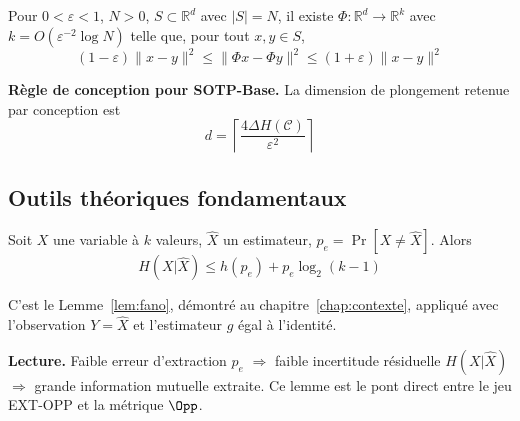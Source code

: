 \begin{sloppypar}
\begin{definition}\label{def:ann_jl}
Pour $0 < \varepsilon < 1$, $N > 0$, $S \subset \mathbb{R}^d$ avec
$|S| = N$, il existe $\Phi\colon \mathbb{R}^d \to \mathbb{R}^k$ avec
$k = O(\varepsilon^{-2} \log N)$ telle que, pour tout $x,y \in S$,
\begin{equation}
(1-\varepsilon)\|x-y\|^2 \leq \|\Phi x-\Phi y\|^2 \leq (1+\varepsilon)\|x-y\|^2
\end{equation}
\end{definition}

\noindent\textbf{R\`egle de conception pour SOTP-Base.}
La dimension de plongement retenue par conception est
\begin{equation}
d = \left\lceil \frac{4\Delta H(\mathcal{C})}{\varepsilon^2} \right\rceil
\label{eq:ann_jl_dim}
\end{equation}

\subsection{Outils th\'eoriques fondamentaux}

\begin{lemma}\label{lem:ann_g_fano}
Soit $X$ une variable à $k$ valeurs, $\hat{X}$ un estimateur,
$p_e = \Pr[X \neq \hat{X}]$. Alors
\begin{equation}
H(X|\hat{X}) \leq h(p_e) + p_e \log_2(k-1)
\end{equation}
\end{lemma}

\begin{Preuve}
C'est le Lemme~\ref{lem:fano}, d\'emontr\'e au chapitre~\ref{chap:contexte}, appliqu\'e
avec l'observation $Y = \hat X$ et l'estimateur $g$ \'egal \`a l'identit\'e.
\end{Preuve}

\noindent\textbf{Lecture.} Faible erreur d'extraction $p_e$
$\Rightarrow$ faible incertitude r\'esiduelle $H(X|\hat{X})$
$\Rightarrow$ grande information mutuelle extraite. Ce lemme est le
pont direct entre le jeu EXT-OPP et la m\'etrique $\Opp$.


\end{sloppypar}
